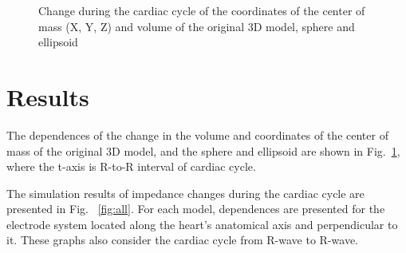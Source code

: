 \documentclass[conference]{IEEEtran}
\begin{document}
\begin{figure}[htbp]
    \caption{Change during the cardiac cycle of the coordinates of the center of mass (X, Y, Z) and volume of the original 3D model, sphere and ellipsoid}
    \label{fig:rxyz}
\end{figure}

\section{Results}

The dependences of the change in the volume and coordinates of the center of
mass of the original 3D model, and the sphere and ellipsoid are shown in
Fig.~\ref{fig:rxyz}, where the t-axis is R-to-R interval of cardiac cycle.

The simulation results of impedance changes during the cardiac cycle are
presented in Fig. ~\ref{fig:all}.
For each model, dependences are presented for the electrode system located along
the heart's anatomical axis and perpendicular to it. These graphs also consider
the cardiac cycle from R-wave to R-wave.
\end{document}
